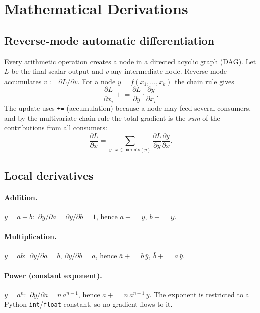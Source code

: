 \documentclass[11pt,a4paper]{article}
\begin{document}
\section{Mathematical Derivations}
\subsection{Reverse-mode automatic differentiation}
Every arithmetic operation creates a node in a directed acyclic graph (DAG). Let $L$ be the final scalar output and $v$ any intermediate node. Reverse-mode accumulates $\bar v := \partial L/\partial v$. For a node $y = f(x_1,\dots,x_k)$ the chain rule gives
\begin{equation}
\frac{\partial L}{\partial x_i} \mathrel{+}= \frac{\partial L}{\partial y}\cdot\frac{\partial y}{\partial x_i}.
\end{equation}
The update uses \texttt{+=} (accumulation) because a node may feed several consumers, and by the multivariate chain rule the total gradient is the \emph{sum} of the contributions from all consumers:
\begin{equation}
\frac{\partial L}{\partial x} = \sum_{y\,:\,x\in \mathrm{parents}(y)} \frac{\partial L}{\partial y}\frac{\partial y}{\partial x}.
\end{equation}

\subsection{Local derivatives}
\paragraph{Addition.} $y=a+b$: $\ \partial y/\partial a = \partial y/\partial b = 1$, hence $\bar a \mathrel{+}= \bar y,\ \bar b \mathrel{+}= \bar y$.

\paragraph{Multiplication.} $y=ab$: $\ \partial y/\partial a = b,\ \partial y/\partial b = a$, hence $\bar a \mathrel{+}= b\,\bar y,\ \bar b \mathrel{+}= a\,\bar y$.

\paragraph{Power (constant exponent).} $y=a^{n}$: $\ \partial y/\partial a = n\,a^{n-1}$, hence $\bar a \mathrel{+}= n\,a^{n-1}\,\bar y$. The exponent is restricted to a Python \texttt{int}/\texttt{float} constant, so no gradient flows to it.
\end{document}
